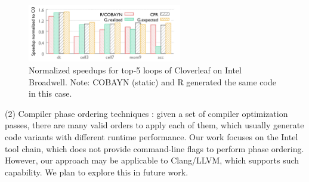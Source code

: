 \begin{figure}
\centering
\includegraphics[width=0.6\textwidth]{gnuplot_temp/deep_dive.pdf}
\vspace{-6mm}
\caption{Normalized speedups for top-5 loops of Cloverleaf on Intel Broadwell.
Note: COBAYN (static) and R generated the same code in this case.}
\label{fig:case}
\vspace{-4mm}
\end{figure}


\vspace{.25em}
\noindent (2) Compiler phase ordering techniques \cite{Kulkarni:2012:MCO:2384616.2384628, Nobre:2016:GIC:2907950.2907959, Kulkarni:2004:FSE:996841.996863, 6662511, micomp}:
given a set of compiler optimization passes, there are many valid orders to apply each of them, which usually generate code variants with different runtime performance.
Our work focuses on the Intel tool chain, which does not provide command-line flags to perform phase ordering.
However, our approach may be applicable to Clang/LLVM, which supports such capability.
We plan to explore this in future work.


